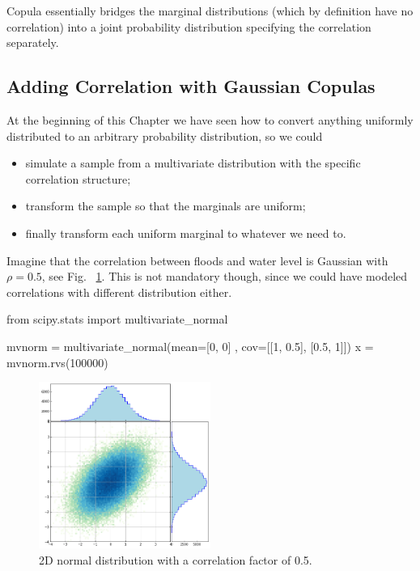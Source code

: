 Copula essentially bridges the marginal distributions (which by definition have no correlation) into a joint probability distribution specifying the correlation separately. 

\subsection{Adding Correlation with Gaussian Copulas}
\label{adding-correlation-with-gaussian-copulas}

At the beginning of this Chapter we have seen how to convert anything uniformly distributed to an arbitrary probability distribution, so we could
\begin{itemize}
\tightlist
\item
  simulate a sample from a multivariate distribution with the specific correlation structure;
\item
  transform the sample so that the marginals are uniform;
\item
  finally transform each uniform marginal to whatever we need to.
\end{itemize}

Imagine that the correlation between floods and water level is Gaussian with $\rho=0.5$, see Fig.~ \ref{fig:multivariate_with_correlation}. This is not mandatory though, since we could have modeled correlations with different distribution either.

\begin{ipython}
from scipy.stats import multivariate_normal

mvnorm = multivariate_normal(mean=[0, 0] , cov=[[1, 0.5],
                                                [0.5, 1]])
x = mvnorm.rvs(100000)
\end{ipython}

\begin{figure}[htbp]
  \centering
  \includegraphics[width=0.5\textwidth]{figures/2d_gaussian}
  \caption{2D normal distribution with a correlation factor of 0.5.}
  \label{fig:multivariate_with_correlation}
\end{figure}
    
